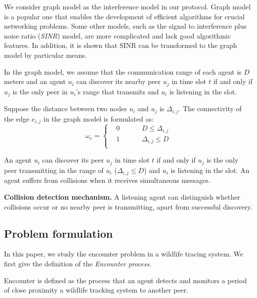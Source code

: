 We consider graph model as the interference model in our protocol. 
Graph model is a popular one that enables the development of
efficient algorithms for crucial networking problems. Some other models,
such as the signal to interference plus noise ratio (\emph{SINR}) model,
are more complicated and lack good algorithmic features. 
In addition, it is shown that SINR can be transformed to the graph model by
particular means.

In the graph model, we assume that the communication range of each agent 
is $D$ meters and an agent $u_i$ can discover its nearby peer $u_j$ 
in time slot $t$ if and only if $u_j$ is the only peer in $u_i$'s range 
that transmits and $u_i$ is listening in the slot.

Suppose the distance between two nodes $u_i$ and $u_j$ is $\Delta_{i,j}$.
The connectivity of the edge $e_{i,j}$ in the graph model is formulated as:
$$ \omega_e=\left\{
\begin{aligned}
&0  & & &   &D \leq \Delta_{i,j}	 \\
&1  & & & &\Delta_{i,j} \leq D	\\
\end{aligned}
\right.
$$
 
An agent $u_i$ can discover its peer $u_j$ in
time slot $t$ if and only if $u_j$ is the only peer transmitting 
in the range of $u_i$ ($\Delta_{i,j} \leq D$) and $u_i$ is listening in the slot.
An agent suffers from collisions when it receives simultaneous messages. 


\textbf{Collision detection mechanism.}
A listening agent can distinguish whether collisions occur or no nearby peer 
is transmitting, apart from successful discovery. 

\subsection{Problem formulation}

In this paper, we study the encounter problem in a wildlife 
tracing system. We first give the definition of the \emph{Encounter process}.
\begin{definition}
Encounter is defined as the process that 
an agent detects and monitors a period of close proximity a wildlife tracking system
to another peer. 
\end{definition}

